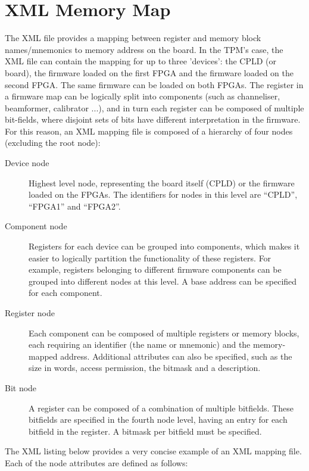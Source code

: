 \documentclass[a4paper,11pt]{article}
\begin{document}
\section{XML Memory Map}
\label{XML}

The XML file provides a mapping between register and memory block 
names/mnemonics to memory address on the board. In the TPM's case, the XML file 
can contain the mapping for up to three 'devices': the CPLD (or board), the 
firmware loaded on the first FPGA and the firmware loaded on the second FPGA. 
The same firmware can be loaded on both FPGAs. The register in a firmware map 
can be logically split into components (such as channeliser, beamformer, 
calibrator ...), and in turn each register can be composed of multiple 
bit-fields, where disjoint sets of bits have different interpretation in the 
firmware. For this reason, an XML mapping file is composed of a hierarchy of 
four nodes (excluding the root node):
\begin{description}
 \item[Device node] Highest level node, representing the board itself (CPLD) or 
the firmware loaded on the FPGAs. The identifiers for nodes in this level are 
``CPLD'', ``FPGA1'' and ``FPGA2''.
 \item[Component node] Registers for each device can be grouped into 
components, which makes it easier to logically partition the functionality of 
these registers. For example, registers belonging to different firmware 
components can be grouped into different nodes at this level. A base address can 
be specified for each component.
 \item[Register node] Each component can be composed of multiple registers or 
memory blocks, each requiring an identifier (the name or mnemonic) and the 
memory-mapped address. Additional attributes can also be specified, such as the 
size in words, access permission, the bitmask and a description. 
 \item[Bit node] A register can be composed of a combination of multiple 
bitfields. These bitfields are specified in the fourth node level, having an 
entry for each bitfield in the register. A bitmask per bitfield must be 
specified.
\end{description}

The XML listing below provides a very concise example of an XML mapping file. 
Each of the node attributes are defined as follows:
\end{document}
